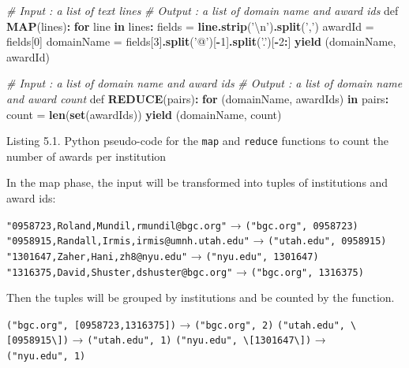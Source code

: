 \documentclass[]{krantz}
\newenvironment{Shaded}{\begin{snugshade}}{\end{snugshade}}
\newcommand{\KeywordTok}[1]{\textcolor[rgb]{0.13,0.29,0.53}{\textbf{#1}}}
\newcommand{\DecValTok}[1]{\textcolor[rgb]{0.00,0.00,0.81}{#1}}
\newcommand{\CharTok}[1]{\textcolor[rgb]{0.31,0.60,0.02}{#1}}
\newcommand{\StringTok}[1]{\textcolor[rgb]{0.31,0.60,0.02}{#1}}
\newcommand{\CommentTok}[1]{\textcolor[rgb]{0.56,0.35,0.01}{\textit{#1}}}
\newcommand{\ControlFlowTok}[1]{\textcolor[rgb]{0.13,0.29,0.53}{\textbf{#1}}}
\newcommand{\OperatorTok}[1]{\textcolor[rgb]{0.81,0.36,0.00}{\textbf{#1}}}
\newcommand{\NormalTok}[1]{#1}
\begin{document}
\begin{Shaded}
\begin{Highlighting}[]
\CommentTok{# Input  : a list of text lines}
\CommentTok{# Output : a list of domain name and award ids}
\NormalTok{def }\KeywordTok{MAP}\NormalTok{(lines)}\OperatorTok{:}
\StringTok{    }\ControlFlowTok{for}\NormalTok{ line }\ControlFlowTok{in}\NormalTok{ lines}\OperatorTok{:}
\StringTok{        }\NormalTok{fields     =}\StringTok{ }\KeywordTok{line.strip}\NormalTok{(}\StringTok{'}\CharTok{\textbackslash{}n}\StringTok{'}\NormalTok{)}\KeywordTok{.split}\NormalTok{(}\StringTok{','}\NormalTok{)}
\NormalTok{        awardId    =}\StringTok{ }\NormalTok{fields[}\DecValTok{0}\NormalTok{]}
\NormalTok{        domainName =}\StringTok{ }\NormalTok{fields[}\DecValTok{3}\NormalTok{]}\KeywordTok{.split}\NormalTok{(}\StringTok{'@'}\NormalTok{)[}\OperatorTok{-}\DecValTok{1}\NormalTok{]}\KeywordTok{.split}\NormalTok{(}\StringTok{'.'}\NormalTok{)[}\OperatorTok{-}\DecValTok{2}\OperatorTok{:}\NormalTok{]}
        \KeywordTok{yield}\NormalTok{ (domainName, awardId)}

\CommentTok{# Input  : a list of domain name and award ids}
\CommentTok{# Output : a list of domain name and award count}
\NormalTok{def }\KeywordTok{REDUCE}\NormalTok{(pairs)}\OperatorTok{:}
\StringTok{    }\ControlFlowTok{for}\NormalTok{ (domainName, awardIds) }\ControlFlowTok{in}\NormalTok{ pairs}\OperatorTok{:}
\StringTok{        }\NormalTok{count =}\StringTok{ }\KeywordTok{len}\NormalTok{(}\KeywordTok{set}\NormalTok{(awardIds))}
        \KeywordTok{yield}\NormalTok{ (domainName, count)}
\end{Highlighting}
\end{Shaded}

Listing 5.1. Python pseudo-code for the \texttt{map} and \texttt{reduce}
functions to count the number of awards per institution

In the map phase, the input will be transformed into tuples of
institutions and award ids:

\texttt{"0958723,Roland,Mundil,rmundil@bgc.org"} →
\texttt{("bgc.org",\ 0958723)}
\texttt{"0958915,Randall,Irmis,irmis@umnh.utah.edu"} →
\texttt{("utah.edu",\ 0958915)}
\texttt{"1301647,Zaher,Hani,zh8@nyu.edu"} →
\texttt{("nyu.edu",\ 1301647)}
\texttt{"1316375,David,Shuster,dshuster@bgc.org"} →
\texttt{("bgc.org",\ 1316375)}

Then the tuples will be grouped by institutions and be counted by the
function.

\texttt{("bgc.org",\ {[}0958723,1316375{]})} → \texttt{("bgc.org",\ 2)}
\texttt{("utah.edu",\ \textbackslash{}{[}0958915\textbackslash{}{]})} →
\texttt{("utah.edu",\ 1)}
\texttt{("nyu.edu",\ \textbackslash{}{[}1301647\textbackslash{}{]})} →
\texttt{("nyu.edu",\ 1)}
\end{document}
